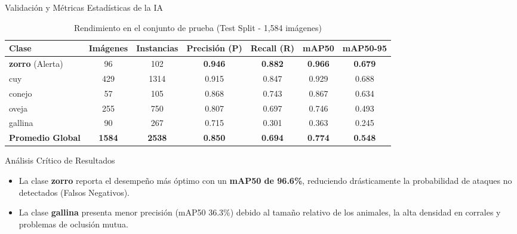 \documentclass[10pt,aspectratio=169]{beamer}
\begin{document}
\begin{frame}{Validación y Métricas Estadísticas de la IA}
  \begin{table}
    \centering
    \caption{Rendimiento en el conjunto de prueba (Test Split - 1,584 imágenes)}
    \scriptsize
    \begin{tabular}{lcccccc}
      \toprule
      \textbf{Clase} & \textbf{Imágenes} & \textbf{Instancias} & \textbf{Precisión (P)} & \textbf{Recall (R)} & \textbf{mAP50} & \textbf{mAP50-95} \\
      \midrule
      \rowcolor{unapblue!10}
      \textbf{zorro} (Alerta) & 96 & 102 & \textbf{0.946} & \textbf{0.882} & \textbf{0.966} & \textbf{0.679} \\
      cuy & 429 & 1314 & 0.915 & 0.847 & 0.929 & 0.688 \\
      conejo & 57 & 105 & 0.868 & 0.743 & 0.867 & 0.634 \\
      oveja & 255 & 750 & 0.807 & 0.697 & 0.746 & 0.493 \\
      gallina & 90 & 267 & 0.715 & 0.301 & 0.363 & 0.245 \\
      \midrule
      \textbf{Promedio Global} & \textbf{1584} & \textbf{2538} & \textbf{0.850} & \textbf{0.694} & \textbf{0.774} & \textbf{0.548} \\
      \bottomrule
    \end{tabular}
  \end{table}

  \begin{block}{Análisis Crítico de Resultados}
    \scriptsize
    \begin{itemize}
      \item La clase \textbf{zorro} reporta el desempeño más óptimo con un \textbf{mAP50 de 96.6\%}, reduciendo drásticamente la probabilidad de ataques no detectados (Falsos Negativos).
      \item La clase \textbf{gallina} presenta menor precisión (mAP50 36.3\%) debido al tamaño relativo de los animales, la alta densidad en corrales y problemas de oclusión mutua.
    \end{itemize}
  \end{block}
\end{frame}
\end{document}
